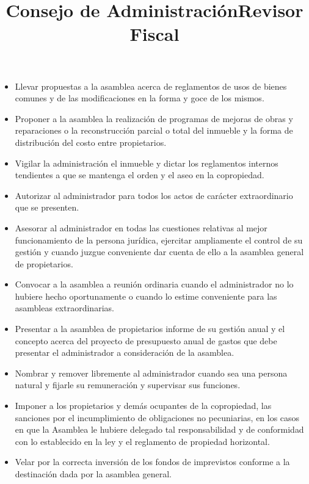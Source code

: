 \title{Consejo de Administración}
\begin{itemize}
\item Llevar propuestas a la asamblea acerca de reglamentos de usos de bienes comunes y de las modificaciones en la forma y goce de los mismos.
\item Proponer a la asamblea la realización de programas de mejoras de obras y reparaciones o la reconstrucción parcial o total del inmueble y la forma de distribución del costo entre propietarios.
\item Vigilar la administración el inmueble y dictar los reglamentos internos tendientes a que se mantenga el orden y el aseo en la copropiedad.
\item Autorizar al administrador para todos los actos de carácter extraordinario que se presenten.
\item Asesorar al administrador en todas las cuestiones relativas al mejor funcionamiento de la persona jurídica, ejercitar ampliamente el control de su gestión y cuando juzgue conveniente dar cuenta de ello a la asamblea general de propietarios.
\item Convocar a la asamblea a reunión ordinaria cuando el administrador no lo hubiere hecho oportunamente o cuando lo estime conveniente para las asambleas extraordinarias.
\item Presentar a la asamblea de propietarios informe de su gestión anual y el concepto acerca del proyecto de presupuesto anual de gastos que debe presentar el administrador a consideración de la asamblea.
\item Nombrar y remover libremente al administrador cuando sea una persona natural y fijarle su remuneración y supervisar sus funciones.
\item Imponer a los propietarios y demás ocupantes de la copropiedad, las sanciones por el incumplimiento de obligaciones no pecuniarias, en los casos en que la Asamblea le hubiere delegado tal responsabilidad y de conformidad con lo establecido en la ley y el reglamento de propiedad horizontal.
\item Velar por la correcta inversión de los fondos de imprevistos conforme a la destinación dada por la asamblea general.

\end{itemize}

\title{Revisor Fiscal}


